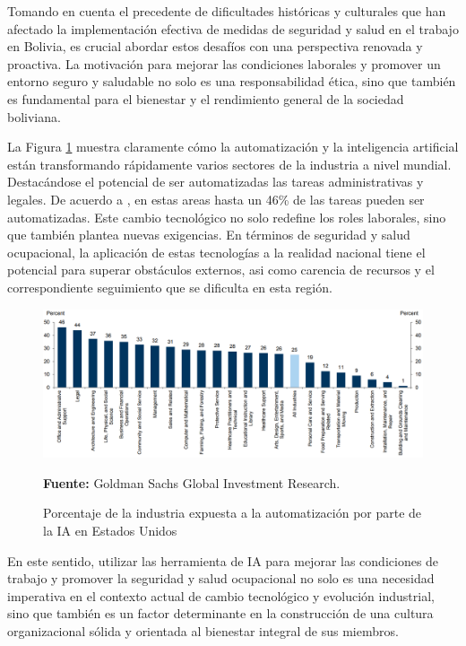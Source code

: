 Tomando en cuenta el precedente de dificultades históricas y culturales que han afectado la implementación efectiva de medidas de seguridad y salud en el trabajo en Bolivia, es crucial abordar estos desafíos con una perspectiva renovada y proactiva. La motivación para mejorar las condiciones laborales y promover un entorno seguro y saludable no solo es una responsabilidad ética, sino que también es fundamental para el bienestar y el rendimiento general de la sociedad boliviana.

La Figura \ref{pics:share_of_industry_exposed_to_automation_ai_gs} muestra claramente cómo la automatización y la inteligencia artificial están transformando rápidamente varios sectores de la industria a nivel mundial. Destacándose el potencial de ser automatizadas las tareas administrativas y legales. De acuerdo a \textcite{hatzius2023potentially}, en estas areas hasta un 46\% de las tareas pueden ser automatizadas. Este cambio tecnológico no solo redefine los roles laborales, sino que también plantea nuevas exigencias. En términos de seguridad y salud ocupacional, la aplicación de estas tecnologías a la realidad nacional tiene el potencial para superar obstáculos externos, asi como carencia de recursos y el correspondiente seguimiento que se dificulta en esta región.  

\begin{figure}[htb]
	\centering
	\includegraphics[width=\textwidth]{images/marcoref/share_of_industry_exposed_to_automation_ai.png}
	\caption{Porcentaje de la industria expuesta a la automatización por parte de la IA en Estados Unidos} \vspace{-0.2cm}
	\footnotesize{\textbf{Fuente:} Goldman Sachs Global Investment Research.}
	\label{pics:share_of_industry_exposed_to_automation_ai_gs} 
\end{figure}

En este sentido, utilizar las herramienta de IA para mejorar las condiciones de trabajo y promover la seguridad y salud ocupacional no solo es una necesidad imperativa en el contexto actual de cambio tecnológico y evolución industrial, sino que también es un factor determinante en la construcción de una cultura organizacional sólida y orientada al bienestar integral de sus miembros.

